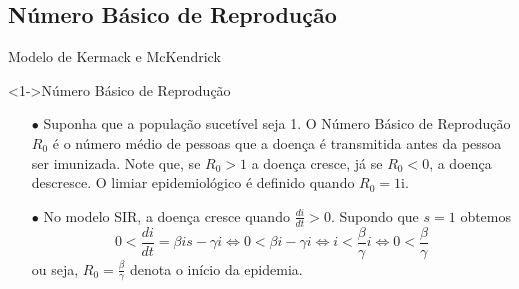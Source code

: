 \documentclass{beamer}
\theoremstyle{plain}
\theoremstyle{definition}
\begin{document}
\subsection{Número Básico de Reprodução}
\begin{frame}{Modelo de Kermack e McKendrick}


    \begin{exampleblock}
        <1->{Número Básico de Reprodução}

        \begin{itemize}
            \item [$\bullet$] Suponha que a população sucetível seja 1. O Número Básico de Reprodução 
                $R_0$ é o número médio de pessoas que a doença é transmitida antes da pessoa ser 
                imunizada. Note que, se $R_0>1$ a doença cresce, já se $R_0<0$, a doença descresce. 
                O limiar epidemiológico é definido quando $R_0 = 1$i.
            \item [$\bullet$] No modelo SIR, a doença cresce quando $\frac{di}{dt} > 0$. Supondo que 
                $s=1$ obtemos
                \[
                 0 < \frac{di}{dt} = \beta i s - \gamma i \iff 
                 0 < \beta i - \gamma i \iff 
                 i < \frac{\beta}{\gamma}i \iff 
                 0 < \frac{\beta}{\gamma}
                \]
                ou seja, $R_0 = \frac{\beta}{\gamma}$ denota o início da epidemia.
        \end{itemize}

    \end{exampleblock} 
    
\end{frame}

\end{document}
